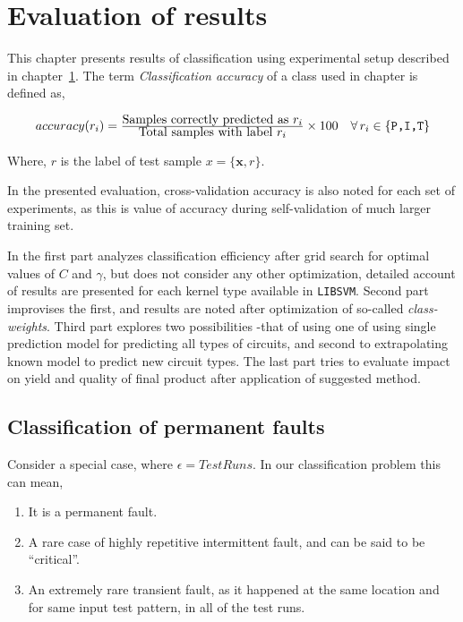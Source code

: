 \chapter{Evaluation of results}
\label{chap:chapter6}
This chapter presents results of classification using experimental setup described in chapter~\ref{chap:chapter6}. The term \emph{Classification accuracy} of a class used in chapter is defined as,

\[ \begin{array}{ll} accuracy(r_i) = \frac{\mbox{Samples correctly predicted as $r_i$}}
								{\mbox{Total samples with label $r_i$}}
							\times 100 & 
							\forall \,r_i \in \{\mbox{\texttt{P,I,T}}\} 
	\end{array}\]

Where, $r$ is the label of test sample $x=\{\boldsymbol{x},r\}$.

In the presented evaluation, cross-validation accuracy is also noted for each set of experiments, as this is value of accuracy during self-validation of much larger training set.

In the first part analyzes classification efficiency after grid search for optimal values of $C$ and $\gamma$, but does not consider any other optimization, detailed account of results are presented for each kernel type available in \texttt{LIBSVM}. Second part improvises the first, and results are noted after optimization of so-called \emph{class-weights}. Third part explores two possibilities -that of using one  of using single prediction model for predicting all types of circuits, and second to extrapolating known model to predict new circuit types. The last part tries to evaluate impact on yield and quality of final product after application of suggested method.

\section{Classification of permanent faults}
\label{sec:wp}
Consider a special case, where $\epsilon = Test Runs$. In our classification problem this can mean,
\begin{enumerate}
  \item It is a permanent fault.
  \item A rare case of highly repetitive intermittent fault, and can be said to be \enquote{critical}.
  \item An extremely rare transient fault, as it happened at the same location and for same input test pattern, in all of the test runs.
\end{enumerate}

